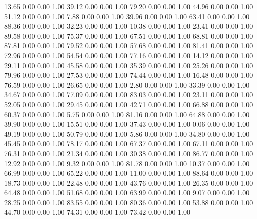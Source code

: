    13.65   0.00   0.00   1.00
   39.12   0.00   0.00   1.00
   79.20   0.00   0.00   1.00
   44.96   0.00   0.00   1.00
   51.12   0.00   0.00   1.00
    7.88   0.00   0.00   1.00
   39.96   0.00   0.00   1.00
   63.41   0.00   0.00   1.00
   88.36   0.00   0.00   1.00
   32.23   0.00   0.00   1.00
   10.38   0.00   0.00   1.00
   23.41   0.00   0.00   1.00
   89.58   0.00   0.00   1.00
   75.37   0.00   0.00   1.00
   67.51   0.00   0.00   1.00
   68.81   0.00   0.00   1.00
   87.81   0.00   0.00   1.00
   79.52   0.00   0.00   1.00
   57.68   0.00   0.00   1.00
   81.41   0.00   0.00   1.00
   72.96   0.00   0.00   1.00
   54.54   0.00   0.00   1.00
   77.16   0.00   0.00   1.00
   14.12   0.00   0.00   1.00
   29.11   0.00   0.00   1.00
   45.58   0.00   0.00   1.00
   35.39   0.00   0.00   1.00
   25.26   0.00   0.00   1.00
   79.96   0.00   0.00   1.00
   27.53   0.00   0.00   1.00
   74.44   0.00   0.00   1.00
   16.48   0.00   0.00   1.00
   76.59   0.00   0.00   1.00
   26.65   0.00   0.00   1.00
    2.80   0.00   0.00   1.00
   33.39   0.00   0.00   1.00
   34.67   0.00   0.00   1.00
   77.09   0.00   0.00   1.00
   83.03   0.00   0.00   1.00
   23.11   0.00   0.00   1.00
   52.05   0.00   0.00   1.00
   29.45   0.00   0.00   1.00
   42.71   0.00   0.00   1.00
   66.88   0.00   0.00   1.00
   60.37   0.00   0.00   1.00
    5.75   0.00   0.00   1.00
   81.16   0.00   0.00   1.00
   64.88   0.00   0.00   1.00
   39.90   0.00   0.00   1.00
   15.51   0.00   0.00   1.00
   37.43   0.00   0.00   1.00
    0.06   0.00   0.00   1.00
   49.19   0.00   0.00   1.00
   50.79   0.00   0.00   1.00
    5.86   0.00   0.00   1.00
   34.80   0.00   0.00   1.00
   45.45   0.00   0.00   1.00
   78.17   0.00   0.00   1.00
   67.37   0.00   0.00   1.00
   67.11   0.00   0.00   1.00
   76.31   0.00   0.00   1.00
   21.34   0.00   0.00   1.00
   30.38   0.00   0.00   1.00
   86.77   0.00   0.00   1.00
   12.92   0.00   0.00   1.00
    9.32   0.00   0.00   1.00
   81.78   0.00   0.00   1.00
   10.37   0.00   0.00   1.00
   66.99   0.00   0.00   1.00
   65.22   0.00   0.00   1.00
   11.00   0.00   0.00   1.00
   88.64   0.00   0.00   1.00
   18.73   0.00   0.00   1.00
   22.48   0.00   0.00   1.00
   43.76   0.00   0.00   1.00
   26.35   0.00   0.00   1.00
   64.48   0.00   0.00   1.00
   51.68   0.00   0.00   1.00
   63.99   0.00   0.00   1.00
    9.07   0.00   0.00   1.00
   28.25   0.00   0.00   1.00
   83.55   0.00   0.00   1.00
   80.36   0.00   0.00   1.00
   53.88   0.00   0.00   1.00
   44.70   0.00   0.00   1.00
   74.31   0.00   0.00   1.00
   73.42   0.00   0.00   1.00
